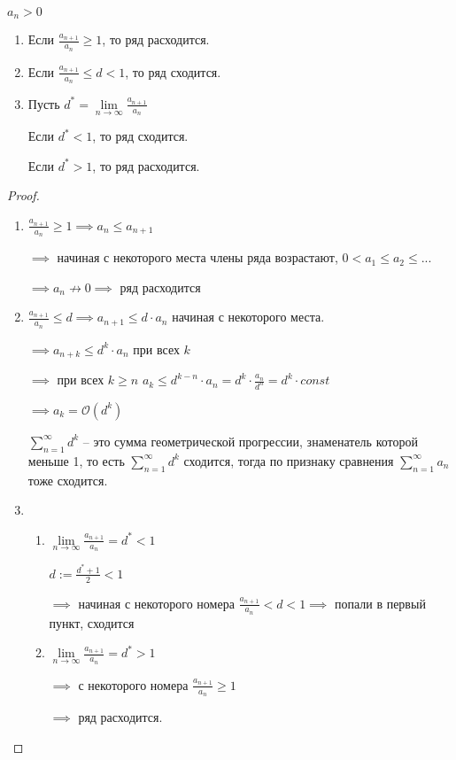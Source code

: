 
\begin{theorem}\thmslashn
	
	$a_n > 0$
	
	\begin{enumerate}
		\item Если $\frac{a_{n+1}}{a_n} \ge 1$, то ряд расходится.
		\item Если $\frac{a_{n+1}}{a_n} \le d < 1$, то ряд сходится.
		\item Пусть $d^* = \lim\limits_{n \to \infty} \frac{a_{n+1}}{a_n}$
		
		Если $d^* < 1$, то ряд сходится.
		
		Если $d^* > 1$, то ряд расходится.
		
	\end{enumerate}
\end{theorem}

\begin{proof}\thmslashn
	
	\begin{enumerate}
		\item $\frac{a_{n+1}}{a_n} \ge 1 \implies a_n \le a_{n+1}$

		$ \implies$ начиная с некоторого места члены ряда возрастают, $0 < a_1 \le a_2 \le ...$
		
		$\implies a_n \not\to 0 \implies$  ряд расходится

		\item $\frac{a_{n+1}}{a_n} \le d \implies a_{n+1} \le d \cdot a_{n}$ начиная с некоторого места.

		$\implies a_{n+k} \le d^k \cdot a_n$ при всех $k$

		$\implies$ при всех $k \ge n$ $a_k \le d^{k - n} \cdot a_n = d^k \cdot \frac{a_n}{d^n} = d^k \cdot const$

		$\implies a_k = \mathcal{O}(d^k)$

		$\sum\limits_{n=1}^{\infty}d^k$ -- это сумма геометрической прогрессии, знаменатель которой меньше 1, то есть $\sum\limits_{n=1}^{\infty}d^k$ сходится, тогда по признаку сравнения $\sum\limits_{n=1}^{\infty}a_n$ тоже сходится.
		
		\item 
		\begin{enumerate}
			\item $\lim\limits_{n \to \infty} \frac{a_{n+1}}{a_n} = d^* < 1$
		
			$d:= \frac{d^*+1}{2} < 1$
		
			$\implies$ начиная с некоторого номера $\frac{a_{n+1}}{a_n} < d < 1 \implies$ попали в первый пункт, сходится
		
			\item $\lim\limits_{n \to \infty} \frac{a_{n+1}}{a_n} = d^* > 1$
		
			$\implies$ с некоторого номера $\frac{a_{n+1}}{a_n} \ge 1$
		
			$\implies$ ряд расходится.
		\end{enumerate} 
	\end{enumerate}
\end{proof}

